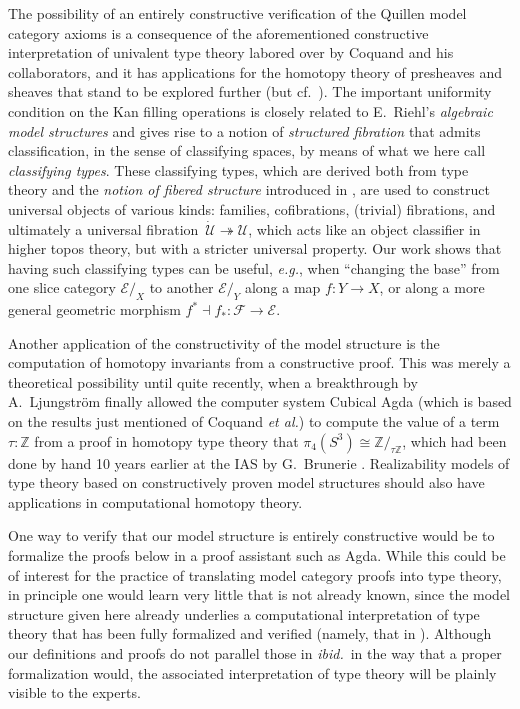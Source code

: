 \documentclass[11pt,reqno]{amsart}
\newcommand{\eg}{\emph{e.g.}}
\newcommand{\ibid}{\emph{ibid.}}
\newcommand{\Z}{\ensuremath{\mathbb{Z}}}
\newcommand{\FF}{\ensuremath{\mathcal{F}}}
\newcommand{\EE}{\ensuremath{\mathcal{E}}}
\newcommand{\slice}[1]{\ensuremath{/_{\!{#1}}}}
\newcommand{\fib}{\ensuremath{\twoheadrightarrow}}
\renewcommand{\to}{\ensuremath{\rightarrow}}
\newcommand{\U}{\ensuremath{\mathcal{U}}}
\newcommand{\UU}{\ensuremath{\,\dot{\mathcal{U}}}}
\theoremstyle{remark}
\theoremstyle{definition}
\begin{document}
The possibility of an entirely constructive verification of the Quillen model category axioms is a consequence of the aforementioned constructive interpretation of univalent type theory labored over by Coquand and his collaborators, and it has applications for the homotopy theory of presheaves and sheaves that stand to be explored further (but cf.~\cite{Coq:stack2017}).   The important uniformity condition on the Kan filling operations is closely related to E.~Riehl's \emph{algebraic model structures} \cite{riehl-algebraic-model} and gives rise to a notion of \emph{structured fibration} that admits classification, in the sense of classifying spaces, by means of what we here call \emph{classifying types}.   These classifying types, which are derived both from type theory and the \emph{notion of fibered structure} introduced in \cite{shulman2019infty1toposes}, are used to construct universal objects of various kinds: families, cofibrations, (trivial) fibrations, and ultimately a universal fibration $\UU\fib\U$, which acts like an object classifier in higher topos theory, but with a stricter universal property.  Our work shows that having such classifying types can be useful, \eg, when ``changing the base'' from one slice category $\EE\slice{X}$ to another $\EE\slice{Y}$ along a map $f : Y\to X$, or along a more general geometric morphism $f^*\dashv f_* : \FF \to \EE$.

Another application of the constructivity of the model structure is the computation of homotopy invariants from a constructive proof.  This was merely a theoretical possibility until quite recently, when a breakthrough by  A.~Ljungstr\"om \cite{AxelLj:2022} finally allowed the computer system Cubical Agda \cite{VezzosiMortbergAbel19} (which is based on the results just mentioned of Coquand \emph{et al.}) to compute the value of a term $\tau:\Z$ from a proof in homotopy type theory that $\pi_4(S^3)\cong \Z/_{\!\tau\Z}$, which had been done by hand 10 years earlier at the IAS by G.\ Brunerie \cite{GB:IAS2013}.  Realizability models of type theory based on constructively proven model structures should also have applications in computational homotopy theory.

One way to verify that our model structure is entirely constructive would be to formalize the proofs below in a proof assistant such as Agda.  While this could be of interest for the practice of translating model category proofs into type theory, in principle one would learn very little that is not already known, since the model structure given here already underlies a computational interpretation of type theory that has been fully formalized and verified (namely, that in \cite{ABCHFL}).  Although our definitions and proofs do not parallel those in \ibid\ in the way that a proper formalization would, the associated interpretation of type theory will be plainly visible to the experts.
\end{document}
